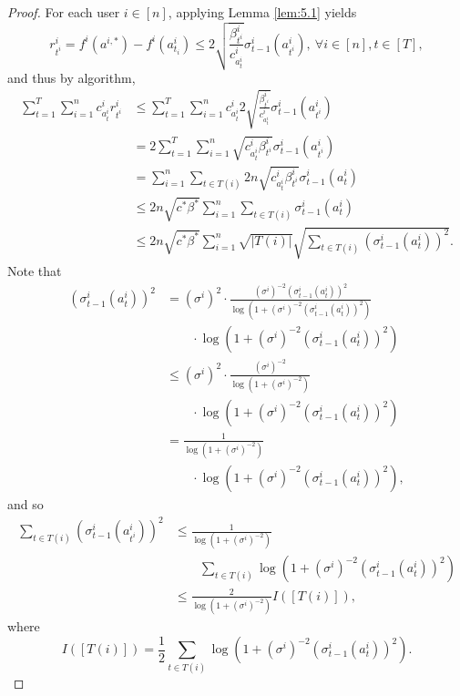 \documentclass[letterpaper]{vldb}
\begin{document}
\begin{proof}
  For each user $i\in [n]$, applying Lemma \ref{lem:5.1} yields
  \[
    r^i_{t^i} = f^i(a^{i,\ast}) - f^i(a^i_{t_i})\le 2
    \sqrt{\frac{\beta^i_{t^i}}{c^i_{a^i_{t}}}}\sigma^i_{t-1}(a^i_{t^i}),\ \forall
    i\in [n], t\in [T],
  \]
   and thus by algorithm,
  \begin{align*}
    \sum_{t=1}^T \sum_{i=1}^n c^i_{a^i_t} r^i_{t^i}
    & \le \sum_{t=1}                                                    ^T \sum_{i=1}^n c^i_{a_t^i} 2 \sqrt{\frac{\beta^i_{t^i}}{c^i_{a^i_{t}}}}\sigma^i_{t-1}(a^i_{t^i})\\
        & = 2  \sum_{t=1}^T \sum_{i=1}^n \sqrt{c^i_{a^i_{t}}\beta^i_{t^i}}\sigma^i_{t-1}(a^i_{t^i})\\
    & = \sum_{i=1}^n\sum_{t\in T(i)} 2n\sqrt{c^i_{a^i_{t}}\beta^i_{t^i}}\sigma^i_{t-1}(a^i_{t})\\
    & \le 2n \sqrt{c^\ast\beta^\ast}\sum_{i=1}^n\sum_{t\in T(i)}\sigma^i_{t-1}(a^i_{t})\\
    & \le 2n \sqrt{c^\ast\beta^\ast}\sum_{i=1}^n\sqrt{|T(i)|}\sqrt{\sum_{t\in T(i)} (\sigma^i_{t-1}(a^i_{t}))^2}.
  \end{align*}
  Note that
\begin{align*}
    (\sigma^i_{t-1}(a^i_{t}))^2
    & = (\sigma^i)^2\cdot \frac{(\sigma^i)^{-2} (\sigma^i_{t-1}(a^i_{t}))^2}{\log\left(1 + (\sigma^i)^{-2} (\sigma^i_{t-1}(a^i_{t}))^2\right)}\\
    &\qquad \cdot \log\left(1 + (\sigma^i)^{-2} (\sigma^i_{t-1}(a^i_{t}))^2\right)\\
    & \le (\sigma^i)^2 \cdot \frac{(\sigma^i)^{-2}}{\log\left(1 + (\sigma^i)^{-2}\right)}\\
    &\qquad \cdot \log\left(1 + (\sigma^i)^{-2} (\sigma^i_{t-1}(a^i_{t}))^2\right)\\
    & = \frac{1}{\log\left(1 + (\sigma^i)^{-2}\right)}\\   
    &\qquad \cdot \log\left(1 + (\sigma^i)^{-2} (\sigma^i_{t-1}(a^i_{t}))^2\right),
  \end{align*}
  and so
  \begin{align*}
      \sum_{t\in T(i)} (\sigma^i_{t-1}(a^i_{t^i}))^2
      & \le \frac{1}{\log\left(1 + (\sigma^i)^{-2}\right)}\\
    &\qquad \sum_{t\in T(i)} \log\left(1 + (\sigma^i)^{-2} (\sigma^i_{t-1}(a^i_{t}))^2\right)\\
    & \le \frac{2}{\log\left(1 + (\sigma^i)^{-2}\right)} I([T(i)]),
  \end{align*}
  where
  \begin{equation}
    \label{eq:I-Ti}
    I([T(i)]) = \frac{1}{2}\sum_{t\in T(i)} \log\left(1 + (\sigma^i)^{-2}(\sigma^i_{t-1}(a^i_{t}))^2\right).
  \end{equation}
\end{proof}
\end{document}
